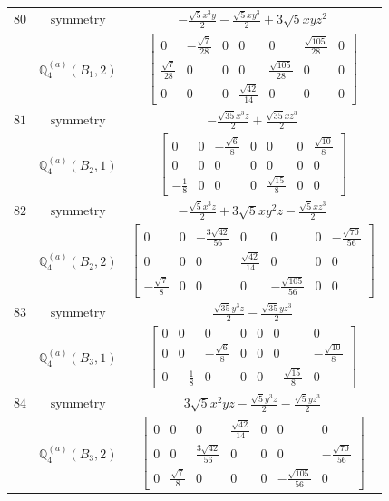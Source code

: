 \documentclass[fleqn,8pt,landscape]{jsarticle}
\begin{document}
\begin{longtable}{ccc}
$ 80 $ & $ \text{symmetry} $ & $ - \frac{\sqrt{5} x^{3} y}{2} - \frac{\sqrt{5} x y^{3}}{2} + 3 \sqrt{5} x y z^{2} $ \\
$  $ & $ \mathbb{Q}_{4}^{(a)}(B_{1},2) $ & $ \begin{bmatrix} 0 & - \frac{\sqrt{7}}{28} & 0 & 0 & 0 & \frac{\sqrt{105}}{28} & 0 \\ \frac{\sqrt{7}}{28} & 0 & 0 & 0 & \frac{\sqrt{105}}{28} & 0 & 0 \\ 0 & 0 & 0 & \frac{\sqrt{42}}{14} & 0 & 0 & 0 \end{bmatrix} $ \\ \hline
$ 81 $ & $ \text{symmetry} $ & $ - \frac{\sqrt{35} x^{3} z}{2} + \frac{\sqrt{35} x z^{3}}{2} $ \\
$  $ & $ \mathbb{Q}_{4}^{(a)}(B_{2},1) $ & $ \begin{bmatrix} 0 & 0 & - \frac{\sqrt{6}}{8} & 0 & 0 & 0 & \frac{\sqrt{10}}{8} \\ 0 & 0 & 0 & 0 & 0 & 0 & 0 \\ - \frac{1}{8} & 0 & 0 & 0 & \frac{\sqrt{15}}{8} & 0 & 0 \end{bmatrix} $ \\ \hline
$ 82 $ & $ \text{symmetry} $ & $ - \frac{\sqrt{5} x^{3} z}{2} + 3 \sqrt{5} x y^{2} z - \frac{\sqrt{5} x z^{3}}{2} $ \\
$  $ & $ \mathbb{Q}_{4}^{(a)}(B_{2},2) $ & $ \begin{bmatrix} 0 & 0 & - \frac{3 \sqrt{42}}{56} & 0 & 0 & 0 & - \frac{\sqrt{70}}{56} \\ 0 & 0 & 0 & \frac{\sqrt{42}}{14} & 0 & 0 & 0 \\ - \frac{\sqrt{7}}{8} & 0 & 0 & 0 & - \frac{\sqrt{105}}{56} & 0 & 0 \end{bmatrix} $ \\ \hline
$ 83 $ & $ \text{symmetry} $ & $ \frac{\sqrt{35} y^{3} z}{2} - \frac{\sqrt{35} y z^{3}}{2} $ \\
$  $ & $ \mathbb{Q}_{4}^{(a)}(B_{3},1) $ & $ \begin{bmatrix} 0 & 0 & 0 & 0 & 0 & 0 & 0 \\ 0 & 0 & - \frac{\sqrt{6}}{8} & 0 & 0 & 0 & - \frac{\sqrt{10}}{8} \\ 0 & - \frac{1}{8} & 0 & 0 & 0 & - \frac{\sqrt{15}}{8} & 0 \end{bmatrix} $ \\ \hline
$ 84 $ & $ \text{symmetry} $ & $ 3 \sqrt{5} x^{2} y z - \frac{\sqrt{5} y^{3} z}{2} - \frac{\sqrt{5} y z^{3}}{2} $ \\
$  $ & $ \mathbb{Q}_{4}^{(a)}(B_{3},2) $ & $ \begin{bmatrix} 0 & 0 & 0 & \frac{\sqrt{42}}{14} & 0 & 0 & 0 \\ 0 & 0 & \frac{3 \sqrt{42}}{56} & 0 & 0 & 0 & - \frac{\sqrt{70}}{56} \\ 0 & \frac{\sqrt{7}}{8} & 0 & 0 & 0 & - \frac{\sqrt{105}}{56} & 0 \end{bmatrix} $ \\ \hline

\end{longtable}
\end{document}
